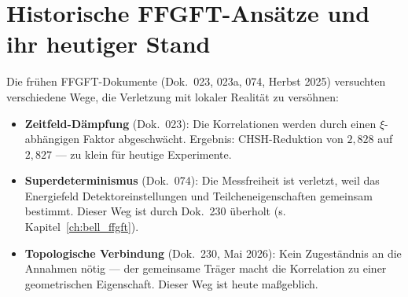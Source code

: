\section{Historische FFGFT-Ansätze und ihr heutiger Stand}

Die frühen FFGFT-Dokumente (Dok.~023, 023a, 074, Herbst 2025)
versuchten verschiedene Wege, die Verletzung mit lokaler Realität
zu versöhnen:

\begin{itemize}
  \item \textbf{Zeitfeld-Dämpfung} (Dok.~023): Die Korrelationen
        werden durch einen $\xi$-abhängigen Faktor abgeschwächt.
        Ergebnis: CHSH-Reduktion von $2{,}828$ auf $2{,}827$ —
        zu klein für heutige Experimente.
  \item \textbf{Superdeterminismus} (Dok.~074): Die Messfreiheit
        ist verletzt, weil das Energiefeld Detektoreinstellungen
        und Teilcheneigenschaften gemeinsam bestimmt. Dieser Weg
        ist durch Dok.~230 überholt (s. Kapitel~\ref{ch:bell_ffgft}).
  \item \textbf{Topologische Verbindung} (Dok.~230, Mai 2026):
        Kein Zugeständnis an die Annahmen nötig — der gemeinsame
        Träger macht die Korrelation zu einer geometrischen
        Eigenschaft. Dieser Weg ist heute maßgeblich.
\end{itemize}

